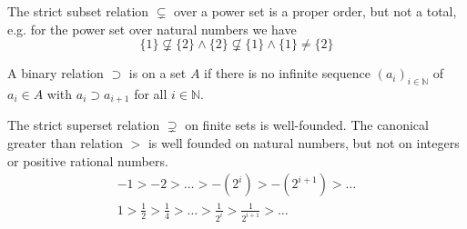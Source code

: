 \begin{example}The strict subset relation $\subsetneq$ over a power set is a proper order, but not a total,
	e.g. for the power set over natural numbers we have
	\[
	\{ 1 \} \not\subsetneq \{ 2 \}
	\land \{ 2 \} \not\subsetneq \{ 1 \}
	\land 	\{ 1 \} \neq \{ 2 \}
	\tag*{non-totality}
	\]
\end{example}



\begin{definition}
	A binary relation $\supset$ is  on a set $A$ if there is no infinite sequence
	$(a_i)_{i\in\mathbb{N}}$ of $a_i\in A$
	with $a_i\supset a_{i+1}$ for all $i\in\mathbb{N}$.
\end{definition}

\begin{example}
	The strict superset relation $\supsetneq$ on finite sets is well-founded.
	The canonical greater than relation $>$ is well founded on natural numbers,
	but not on integers or positive rational numbers.
	\begin{gather*}
	-1 > -2 > \ldots > -(2^i) > -(2^{i+1}) > \ldots\\
	1 > \frac{1}{2} > \frac{1}{4} > \ldots > \frac{1}{2^i} > \frac{1}{2^{i+1}} > \ldots
	\end{gather*}
\end{example}



